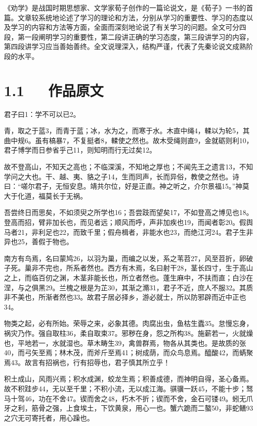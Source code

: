\documentclass[letterpaper,12pt,english]{sphinxmanual}
\begin{document}
《劝学》是战国时期思想家、文学家荀子创作的一篇论说文，是《荀子》一书的首篇。文章较系统地论述了学习的理论和方法，分别从学习的重要性、学习的态度以及学习的内容和方法等方面，全面而深刻地论说了有关学习的问题。全文可分四段，第一段阐明学习的重要性，第二段讲正确的学习态度，第三段讲学习的内容，第四段讲学习应当善始善终。全文说理深入，结构严谨，代表了先秦论说文成熟阶段的水平。


\section{1.1   作品原文}
\label{\detokenize{p01_u6563_u6587/_u8340_u5b50-_u529d_u5b66:id3}}
君子曰1：学不可以已2。

青，取之于蓝3，而青于蓝；冰，水为之，而寒于水。木直中绳4，輮以为轮5，其曲中规6。虽有槁暴7，不复挺者8，輮使之然也。故木受绳则直9，金就砺则利10，君子博学而日参省乎己11，则知明而行无过矣12。

故不登高山，不知天之高也；不临深溪，不知地之厚也；不闻先王之遗言13，不知学问之大也。干、越、夷、貉之子14，生而同声，长而异俗，教使之然也。诗曰：“嗟尔君子，无恒安息。靖共尔位，好是正直。神之听之，介尔景福15。”神莫大于化道，福莫长于无祸。

吾尝终日而思矣，不如须臾之所学也16；吾尝跂而望矣17，不如登高之博见也18。登高而招，臂非加长也，而见者远；顺风而呼，声非加疾也19，而闻者彰20。假舆马者21，非利足也22，而致千里；假舟楫者，非能水也23，而绝江河24。君子生非异也25，善假于物也。

南方有鸟焉，名曰蒙鸠26，以羽为巢，而编之以发，系之苇苕27，风至苕折，卵破子死。巢非不完也，所系者然也。西方有木焉，名曰射干28，茎长四寸，生于高山之上，而临百仞之渊，木茎非能长也，所立者然也。蓬生麻中，不扶而直；白沙在涅，与之俱黑29。兰槐之根是为芷30，其渐之滫31，君子不近，庶人不服32。其质非不美也，所渐者然也33。故君子居必择乡，游必就士，所以防邪辟而近中正也34。

物类之起，必有所始。荣辱之来，必象其德。肉腐出虫，鱼枯生蠹35。怠慢忘身，祸灾乃作。强自取柱36，柔自取束37。邪秽在身，怨之所构38。施薪若一，火就燥也，平地若一，水就湿也。草木畴生39，禽兽群焉，物各从其类也。是故质的张40，而弓矢至焉；林木茂，而斧斤至焉41；树成荫，而众鸟息焉。醯酸42，而蜹聚焉43。故言有招祸也，行有招辱也，君子慎其所立乎！

积土成山，风雨兴焉；积水成渊，蛟龙生焉；积善成德，而神明自得，圣心备焉。故不积跬步44，无以至千里；不积小流，无以成江海。骐骥一跃45，不能十步；驽马十驾46，功在不舍47。锲而舍之48，朽木不折；锲而不舍，金石可镂49。蚓无爪牙之利，筋骨之强，上食埃土，下饮黄泉，用心一也。蟹六跪而二螯50，非蛇鳝93之穴无可寄托者，用心躁也。
\end{document}
